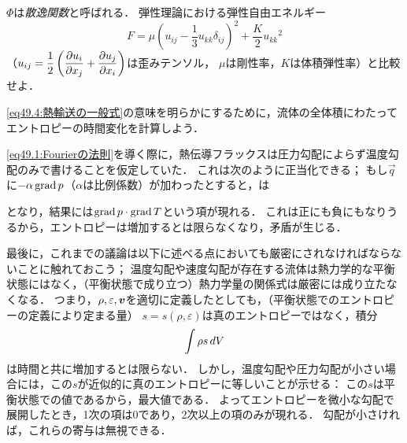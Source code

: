 $\Phi$は\emph{散逸関数}と呼ばれる．
弾性理論における弾性自由エネルギー
\[
    F = \mu \left( u_{ij} - \frac{1}{3} u_{kk} \delta_{ij} \right)^2 + \frac{K}{2} {u_{kk}}^2
\]
（$ u_{ij} = \dfrac{1}{2} \left( \dpdv{u_i}{x_j} + \dpdv{u_j}{x_i} \right)$は歪みテンソル，
$\mu$は剛性率，$K$は体積弾性率）と比較せよ．



\eqref{eq49.4:熱輸送の一般式}の意味を明らかにするために，流体の全体積にわたってエントロピーの時間変化を計算しよう．






\eqref{eq49.1:Fourierの法則}を導く際に，熱伝導フラックスは圧力勾配によらず温度勾配のみで書けることを仮定していた．
これは次のように正当化できる；
もし$\vec{q}$に$-\alpha \operatorname{grad} p$（$\alpha$は比例係数）が加わったとすると，は

となり，結果には$\operatorname{grad} p \cdot \operatorname{grad} T$という項が現れる．
これは正にも負にもなりうるから，エントロピーは増加するとは限らなくなり，矛盾が生じる．




最後に，これまでの議論は以下に述べる点においても厳密にされなければならないことに触れておこう；
温度勾配や速度勾配が存在する流体は熱力学的な平衡状態にはなく，（平衡状態で成り立つ）熱力学量の関係式は厳密には成り立たなくなる．
つまり，$\rho,\varepsilon,\vb*{v}$を適切に定義したとしても，（平衡状態でのエントロピーの定義により定まる量）
$s=s(\rho, \varepsilon)$は真のエントロピーではなく，積分
\[
    \int \rho s \, dV
\]
は時間と共に増加するとは限らない．
しかし，温度勾配や圧力勾配が小さい場合には，この$s$が近似的に真のエントロピーに等しいことが示せる：
この$s$は平衡状態での値であるから，最大値である．
よってエントロピーを微小な勾配で展開したとき，1次の項は0であり，2次以上の項のみが現れる．
勾配が小さければ，これらの寄与は無視できる．









\BackToTheToc